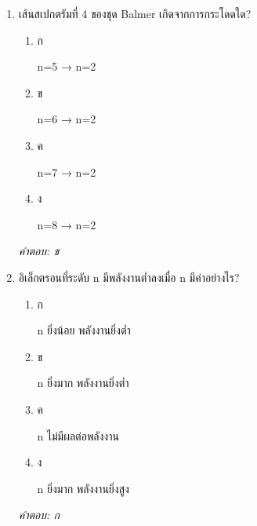 \documentclass[12pt]{article}
\begin{document}
\begin{enumerate}[label=\arabic*., itemsep=0.5\baselineskip, topsep=0.5\baselineskip, leftmargin=*]
\item เส้นสเปกตรัมที่ 4 ของชุด Balmer เกิดจากการกระโดดใด?
\begin{enumerate}[label=\alph*)., itemsep=0.3\baselineskip, topsep=0.3\baselineskip]
\item ก\ 
\begin{minipage}[t]{0.9\linewidth}
\raggedright n=5 → n=2
\end{minipage}
\item ข\ 
\begin{minipage}[t]{0.9\linewidth}
\raggedright n=6 → n=2
\end{minipage}
\item ค\ 
\begin{minipage}[t]{0.9\linewidth}
\raggedright n=7 → n=2
\end{minipage}
\item ง\ 
\begin{minipage}[t]{0.9\linewidth}
\raggedright n=8 → n=2
\end{minipage}
\end{enumerate}
\vspace{-0.3\baselineskip}
\begin{small}
\textit{คำตอบ: ข}
\end{small}

\item อิเล็กตรอนที่ระดับ n มีพลังงานต่ำลงเมื่อ n มีค่าอย่างไร?
\begin{enumerate}[label=\alph*)., itemsep=0.3\baselineskip, topsep=0.3\baselineskip]
\item ก\ 
\begin{minipage}[t]{0.9\linewidth}
\raggedright n ยิ่งน้อย พลังงานยิ่งต่ำ
\end{minipage}
\item ข\ 
\begin{minipage}[t]{0.9\linewidth}
\raggedright n ยิ่งมาก พลังงานยิ่งต่ำ
\end{minipage}
\item ค\ 
\begin{minipage}[t]{0.9\linewidth}
\raggedright n ไม่มีผลต่อพลังงาน
\end{minipage}
\item ง\ 
\begin{minipage}[t]{0.9\linewidth}
\raggedright n ยิ่งมาก พลังงานยิ่งสูง
\end{minipage}
\end{enumerate}
\vspace{-0.3\baselineskip}
\begin{small}
\textit{คำตอบ: ก}
\end{small}


\end{enumerate}
\end{document}
